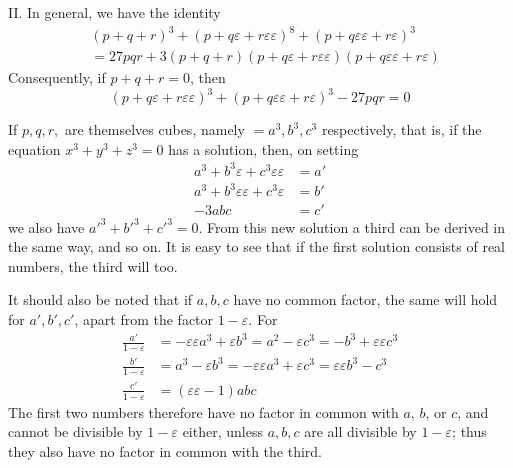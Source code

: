 II. In general, we have the identity
\[
\begin{aligned}
&(p+q+r)^3+(p+q\varepsilon+r\varepsilon\varepsilon)^8+(p+q\varepsilon\varepsilon+r\varepsilon)^3\\
&=27pqr+3(p+q+r)(p+q\varepsilon+r\varepsilon\varepsilon)(p+q\varepsilon\varepsilon+r\varepsilon)
\end{aligned}
\]
Consequently, if $p+q+r=0$, then
\[
(p+q\varepsilon+r\varepsilon\varepsilon)^3+(p+q\varepsilon\varepsilon+r\varepsilon)^3-27pqr=0
\]

If $p,q,r,$ are themselves cubes, namely $=a^3,b^3,c^3$ respectively, that is, if the equation $x^3+y^3+z^3=0$ has a solution, then, on setting
\[
\begin{aligned}
a^3+b^3\varepsilon+c^3\varepsilon\varepsilon&=a'\\
a^3+b^3\varepsilon\varepsilon+c^3\varepsilon&=b'\\
-3abc&=c'
\end{aligned}
\]
we also have $a'^3+b'^3+c'^3=0$. From this new solution a third can be derived in the same way, and so on. It is easy to see that if the first solution consists of real numbers, the third will too.

It should also be noted that if $a,b,c$ have no common factor, the same will hold for $a',b',c'$, apart from the factor $1-\varepsilon$. For
\[
\begin{aligned}
\frac{a'}{1-\varepsilon}&=-\varepsilon\varepsilon a^3+\varepsilon b^3=a^2-\varepsilon c^3=-b^3+\varepsilon\varepsilon c^3\\
\frac{b'}{1-\varepsilon}&=a^3-\varepsilon b^3=-\varepsilon\varepsilon a^3+\varepsilon c^3=\varepsilon\varepsilon b^3-c^3\\
\frac{c'}{1-\varepsilon}&=(\varepsilon\varepsilon-1)abc
\end{aligned}
\]
The first two numbers therefore have no factor in common with $a$, $b$, or $c$, and cannot be divisible by $1-\varepsilon$ either, unless $a,b,c$
%
are all divisible by $1-\varepsilon$; thus they also have no factor in common with the third.

